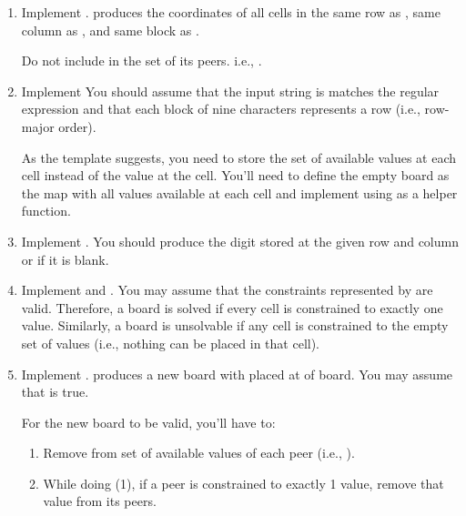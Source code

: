 \documentclass{book}
\begin{document}
\begin{enumerate}

\item Implement .   produces the coordinates of all cells in the same row as , same column as , and same block as .

   Do not include  in the set of its peers. i.e.,  .

\item Implement  You  should assume that the input string is matches the regular expression  and that each block of nine characters represents a row (i.e., row-major order).

   As the template suggests, you need to store the set of available values at
   each cell instead of the value at the cell. You'll need to define
   the empty board as the map with all values available at each cell and
   implement  using  as a helper function.

\item Implement . You should produce the digit stored at the given row and column or  if it is blank.
\item Implement  and . You may assume
   that the constraints represented by  are valid. Therefore, a board
   is solved if every cell is constrained to exactly one value. Similarly,
   a board is unsolvable if any cell is constrained to the empty set of values
   (i.e., nothing can be placed in that cell).

\item Implement .  produces a new board with
    placed at  of  board.  You may assume that
    is true.

   For the new board to be valid, you'll have to:

   \begin{enumerate}
   \item Remove  from set of available values of each peer
      (i.e., ).
   \item While doing (1), if a peer is constrained to exactly 1 value, remove
      that value from its peers.
   \end{enumerate}


\end{enumerate}
\end{document}

